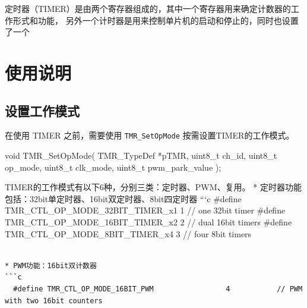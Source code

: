 \documentclass[
  12pt,
]{book}
\newenvironment{Shaded}{\begin{snugshade}}{\end{snugshade}}
\newcommand{\DataTypeTok}[1]{\textcolor[rgb]{0.13,0.29,0.53}{#1}}
\newcommand{\NormalTok}[1]{#1}
\begin{document}
定时器（TIMER）是由两个寄存器组成的，其中一个寄存器用来确定计数器的工作形式和功能，
另外一个计时器是用来控制单片机的启动和停止的，同时也设置了一个

\hypertarget{ux4f7fux7528ux8bf4ux660e-7}{%
\section{使用说明}\label{ux4f7fux7528ux8bf4ux660e-7}}

\hypertarget{ux8bbeux7f6eux5de5ux4f5cux6a21ux5f0f}{%
\subsection{设置工作模式}\label{ux8bbeux7f6eux5de5ux4f5cux6a21ux5f0f}}

在使用 TIMER 之前，需要使用 \texttt{TMR\_SetOpMode} 按需设置TIMER的工作模式。

\begin{Shaded}
\begin{Highlighting}[]
\DataTypeTok{void}\NormalTok{ TMR_SetOpMode(}
\NormalTok{  TMR_TypeDef *pTMR, }
  \DataTypeTok{uint8_t}\NormalTok{ ch_id, }
  \DataTypeTok{uint8_t}\NormalTok{ op_mode, }
  \DataTypeTok{uint8_t}\NormalTok{ clk_mode, }
  \DataTypeTok{uint8_t}\NormalTok{ pwm_park_value}
\NormalTok{  );}
\end{Highlighting}
\end{Shaded}

TIMER的工作模式有以下6种，分别三类：定时器、PWM、复用。
* 定时器功能包括：32bit单定时器、16bit双定时器、8bit四定时器
```c
\#define TMR\_CTL\_OP\_MODE\_32BIT\_TIMER\_x1 1 // one 32bit timer
\#define TMR\_CTL\_OP\_MODE\_16BIT\_TIMER\_x2 2 // dual 16bit timers
\#define TMR\_CTL\_OP\_MODE\_8BIT\_TIMER\_x4 3 // four 8bit timers

\begin{verbatim}

* PWM功能：16bit双计数器
```c
  #define TMR_CTL_OP_MODE_16BIT_PWM                 4           // PWM with two 16bit counters
\end{verbatim}
\end{document}
